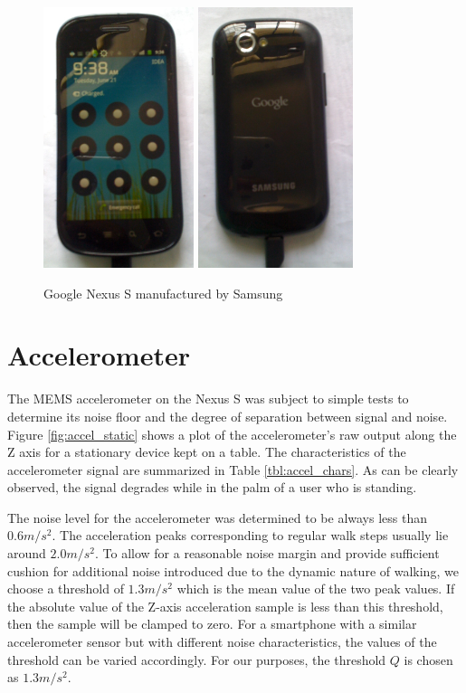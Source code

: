 \begin{figure}
\centering
    \includegraphics[height=3in]{figures/android_front}
    \includegraphics[height=3in]{figures/android_back}
\caption{Google Nexus S manufactured by Samsung}
\end{figure}



\section{Accelerometer}

The MEMS accelerometer on the Nexus S was subject to simple tests to determine 
its noise floor and the degree of separation between signal and noise.
Figure \ref{fig:accel_static} shows a plot of the accelerometer's raw output 
along the Z axis for a stationary device kept on a table. The characteristics
of the accelerometer signal are summarized in Table \ref{tbl:accel_chars}.
As can be clearly observed, the signal degrades while in the palm of a 
user who is standing.

The noise level for the accelerometer was determined to be always less
than $0.6 m/s^2$. The acceleration peaks corresponding to regular walk steps 
usually lie around $2.0 m/s^2$. To allow for a reasonable noise margin and provide
sufficient cushion for additional noise introduced due to the dynamic nature of
walking, we choose a threshold of $1.3 m/s^2$ which is the mean value of the two
peak values. If the absolute value of the Z-axis acceleration sample is less
than this threshold, then the sample will be clamped to zero. For a smartphone
with a similar accelerometer sensor but with different noise characteristics,
the values of the threshold can be varied accordingly. For our purposes, 
the threshold $Q$ is chosen as $1.3 m/s^2$.



